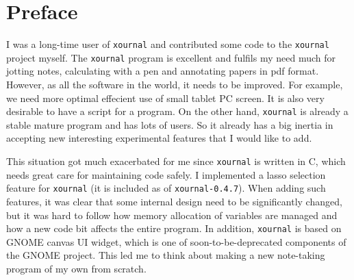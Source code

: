 \documentclass[11pt,fleqn]{book} %
\begin{document}

\pagestyle{fancy} %

\tableofcontents %

\cleardoublepage %




\pagestyle{fancy} %


\chapter*{Preface}


I was a long-time user of \verb|xournal| and contributed some code 
to the \verb|xournal| project myself. The \verb|xournal| program 
is excellent and fulfils my need much for jotting notes,  calculating with a pen 
and annotating papers in pdf format. However, as all the software in the world,
it needs to be improved. For example, we need more optimal effecient use of 
small tablet PC screen.  It is also very desirable to have a script for a program.
On the other hand, \verb|xournal| is already a stable mature program and 
has lots of users. So it already has a big inertia in accepting new interesting 
experimental features that I would like to add. 

This situation got much exacerbated for me since \verb|xournal| is written in C, 
which needs great care for maintaining code safely. I implemented a lasso selection feature 
for \verb|xournal| (it is included as of \verb|xournal-0.4.7|). 
When adding such features, it was clear that some internal 
design need to be significantly changed, but it was hard to follow how memory allocation of 
variables are managed and how a new code bit affects the entire program. 
In addition, \verb|xournal| is
based on GNOME canvas UI widget, which is one of soon-to-be-deprecated components 
of the GNOME project.
This led me to think about making a new note-taking program of my own from scratch. 
\end{document}
